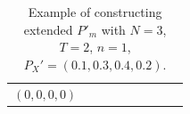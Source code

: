 \documentclass[11pt,letterpaper]{article}
\begin{document}
\begin{table}[]
\begin{tabular}{c||cccc||cccc}
$(0,0,0,0)$ & \multicolumn{1}{c|}{}                                                & \multicolumn{1}{c|}{}                         & \multicolumn{1}{c|}{}                         &                          & \multicolumn{1}{c|}{}                         & \multicolumn{1}{c|}{}                         & \multicolumn{1}{c|}{}                         &                          \\ 
\end{tabular}
\caption{Example of constructing extended $P'_m$ with $N=3$, $T= 2$, $n = 1$, $P_X'=(0.1, 0.3, 0.4, 0.2)$.}
\label{tab:construct_big_pm'}
\end{table}


\begin{table}[]
\centering
\begin{tabular}{c||ccc||ccc}


\end{tabular}
\end{table}
\end{document}
